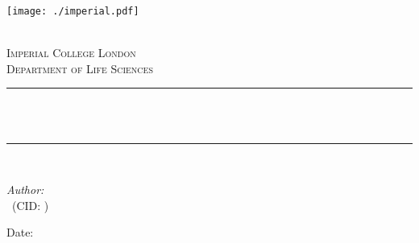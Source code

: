 \begin{titlepage}

    \newcommand{\HRule}{\rule{\linewidth}{0.5mm}} %
    
    
    \texttt{[image: ./imperial.pdf]}\\[0.6cm] 
    
    \begin{center} %
    
    \textsc{\LARGE \reporttype}\\[1.5cm] 
    \textsc{\Large Imperial College London}\\[0.5cm] 
    \textsc{\large Department of Life Sciences}\\[0.5cm] 
    
    \HRule \\[0.4cm]
    { \huge \bfseries \reporttitle}\\ %
    \HRule \\[1.5cm]
    \end{center}
    
    \begin{flushleft} \large
    \textit{Author:}\\
    \reportauthor~(CID: \cid) %
    \end{flushleft}
    \vspace{2cm}
    \makeatletter
    Date: \@date 
    
    \vfill %
    
    
    
    \makeatother
    
    
    \end{titlepage}
    
    